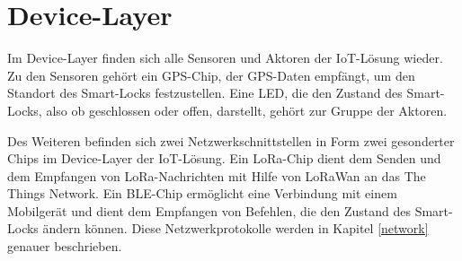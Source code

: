 
\section{Device-Layer}

Im Device-Layer finden sich alle Sensoren und Aktoren der \ac{IoT}-Lösung wieder. 
Zu den Sensoren gehört ein \ac{GPS}-Chip, der \ac{GPS}-Daten empfängt, um den Standort des Smart-Locks festzustellen. Eine \ac{LED}, die den Zustand des Smart-Locks, also ob geschlossen 
oder offen, darstellt, gehört zur Gruppe der Aktoren.

Des Weiteren befinden sich zwei Netzwerkschnittstellen in Form zwei gesonderter Chips im Device-Layer der \ac{IoT}-Lösung. Ein \ac{LoRa}-Chip dient dem Senden und dem Empfangen von 
\ac{LoRa}-Nachrichten mit Hilfe von \ac{LoRaWan} an das \glqq The Things Network\grqq. Ein \ac{BLE}-Chip ermöglicht eine Verbindung mit einem Mobilgerät und dient dem Empfangen von Befehlen, 
die den Zustand des Smart-Locks ändern können. Diese Netzwerkprotokolle werden in Kapitel \ref{network} genauer beschrieben.